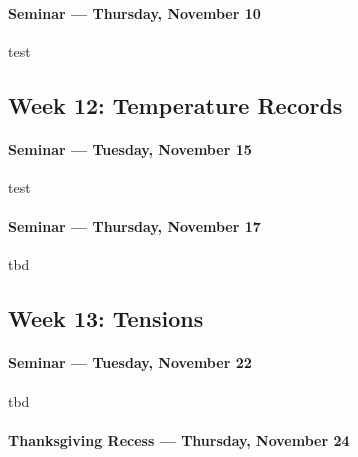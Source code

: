     
    \paragraph{Seminar --- Thursday, November 10}
    
    \begin{itemize*}
    \item test	
    \end{itemize*}	
    
    \subsection{\textbf{Week 12}: Temperature Records}
    
    \paragraph{Seminar --- Tuesday, November 15}
    
    \begin{itemize*}
    \item test
    \end{itemize*}
    
    
    \paragraph{Seminar --- Thursday, November 17}
    
    \begin{itemize*}
    \item tbd
    \end{itemize*}	
    
    \subsection{\textbf{Week 13}: Tensions}
    
    \paragraph{Seminar --- Tuesday, November 22}
    
    \begin{itemize*}
    \item tbd
    \end{itemize*}
    
    
    \paragraph{Thanksgiving Recess --- Thursday, November 24}
    
